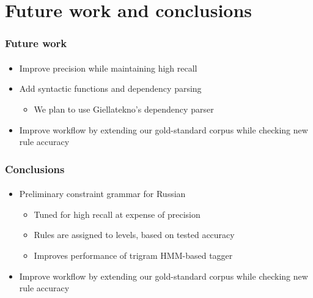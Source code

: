 \documentclass{beamer}
\begin{document}
\section{Future work and conclusions} %

\begin{frame}
\frametitle{Future work}
\framesubtitle{}
\begin{itemize}
	\item Improve precision while maintaining high recall
	\pause
	\item Add syntactic functions and dependency parsing
	\begin{itemize}
		\item We plan to use Giellatekno's dependency parser \cite{antonsen10}
		\pause
	\end{itemize}
	\item Improve workflow by extending our gold-standard corpus while checking new rule accuracy
\end{itemize}
\end{frame}

\begin{frame}
\frametitle{Conclusions}
\framesubtitle{}
\begin{itemize}
	\item Preliminary constraint grammar for Russian
	\pause
	\begin{itemize}
		\item Tuned for high recall at expense of precision
		\pause
		\item Rules are assigned to levels, based on tested accuracy
		\pause
		\item Improves performance of trigram HMM-based tagger
		\pause
	\end{itemize}
	\item Improve workflow by extending our gold-standard corpus while checking new rule accuracy
\end{itemize}
\end{frame}


\begin{tiny}

\end{tiny}
\end{document}
